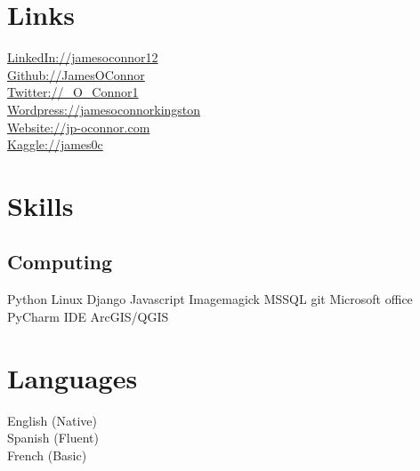 \documentclass[]{JOC_CV}
\begin{document}
\begin{minipage}[t]{0.33\textwidth}

\section{Links}\label{sec:links}
\href{https://www.linkedin.com/in/jamesoconnor12/}{LinkedIn://jamesoconnor12} \\
\href{https://github.com/JamesOConnor}{Github://JamesOConnor} \\
\href{https://twitter.com/James\_o\_connor1}{Twitter://\@James\_O\_Connor1} \\
\href{https://jamesoconnorkingston.wordpress.com}{Wordpress://jamesoconnorkingston} \\
\href{http://www.jp-oconnor.com}{Website://jp-oconnor.com} \\
\href{https://www.kaggle.com/james0c}{Kaggle://james0c}
\sectionsep


\section{Skills}\label{sec:skills}
\subsection{Computing}\label{subsec:computing}
Python \textbullet{} Linux \textbullet{} Django \textbullet{} Javascript \textbullet{} Imagemagick \textbullet{} MSSQL \textbullet{} git \linebreak
{}
Microsoft office \textbullet{} PyCharm IDE \textbullet{} ArcGIS/QGIS
\sectionsep


\section{Languages}\label{sec:languages}
English (Native) \\
Spanish (Fluent) \\
French (Basic) \\
\sectionsep

%
%

\end{minipage}
\end{document}
